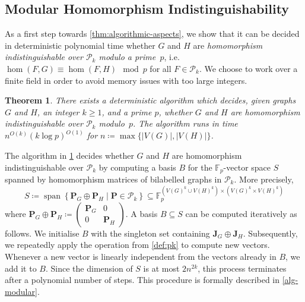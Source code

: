\documentclass[11pt,a4paper]{article}
\theoremstyle{plain}
\newtheorem{thm}{Theorem}[section]
\theoremstyle{remark}
\theoremstyle{definition}
\DeclareMathOperator{\spn}{span}
\begin{document}
\subsection{Modular Homomorphism Indistinguishability}
\label{sec:mod-hom}
As a first step towards \cref{thm:algorithmic-aspects}, we show that it can be decided in deterministic polynomial time whether $G$ and $H$ are \emph{homomorphism indistinguishable over $\mathcal{P}_k$ modulo a prime~$p$}, i.e.\ $\hom(F, G) \equiv \hom(F, H) \mod p$ for all $F \in \mathcal{P}_k$. 
We choose to work over a finite field in order to avoid memory issues with too large integers.


\begin{thm}\label{thm:algorithmic-aspects-prime}
    There exists a deterministic algorithm which decides, given graphs $G$ and $H$, an integer $k\geq 1$, and a prime $p$,
    whether $G$ and $H$ are homomorphism indistinguishable over $\mathcal{P}_k$ modulo~$p$.
    The algorithm runs in time $n^{O(k)} (k \log p)^{O(1)}$ for $n \coloneqq \max \{\lvert V(G) \rvert , \lvert V(H) \rvert  \}$.
\end{thm}

The algorithm in \cref{thm:algorithmic-aspects-prime} decides whether $G$ and $H$ are homomorphism indistinguishable over $\mathcal{P}_k$ by computing a basis $B$ for the $\mathbb{F}_p$-vector space $S$ spanned by homomorphism matrices of bilabelled graphs in $\mathcal{P}_k$. More precisely,
\[
    S \coloneqq \spn\left\{ \boldsymbol{P}_G\oplus \boldsymbol{P}_H \mid \boldsymbol{P} \in \mathcal{P}_k \right\} \subseteq \mathbb{F}_p^{(V(G)^k \cup V(H)^k) \times (V(G)^k \times V(H)^k)}
\]
where $\boldsymbol{P}_G \oplus \boldsymbol{P}_H \coloneqq \left( \begin{smallmatrix} \boldsymbol{P}_G & 0 \\ 0 & \boldsymbol{P}_H \end{smallmatrix} \right)$.
A basis $B \subseteq S$ can be computed iteratively as follows.
We initialise $B$ with the singleton set containing $\boldsymbol{J}_G \oplus \boldsymbol{J}_H$.
Subsequently, we repeatedly apply the operation from \cref{def:pk} to compute new vectors. 
Whenever a new vector is linearly independent from the vectors already in $B$, we add it to $B$.
Since the dimension of $S$ is at most $2n^{2k}$, this process terminates after a polynomial number of steps.
This procedure is formally described in \cref{alg-modular}.
\end{document}
